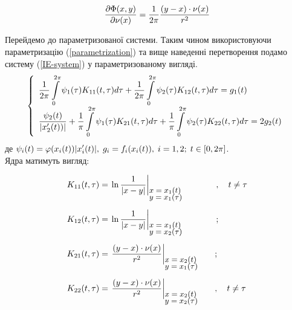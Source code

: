 \documentclass[14pt,a4paper]{extarticle}
\newcounter{e}
\numberwithin{equation}{section}
\newcommand{\intl}{\int\limits}
\newcommand{\inttwopi}{\intl_{0}^{2\pi}}
\begin{document}
\begin{equation}
	\pdv{\Phi(x, y)}{\nu(x)} = \frac{1}{2\pi} \frac{(y - x) \cdot \nu(x)}{r^2} 
\end{equation}


Перейдемо до параметризованої системи. Таким чином використовуючи параметризацію (\ref{parametrization}) та вище наведенні перетворення подамо систему (\ref{IE-system}) у параметризованому вигляді.
\begin{equation}
\label{IE-parametrized-with-specia}
	\left\{
	\begin{array}{l}
		\displaystyle
		\frac{1}{2\pi} \inttwopi \psi_1(\tau) K_{11}(t, \tau) d \tau
		+ \frac{1}{2\pi} \inttwopi  \psi_2(\tau) K_{12}(t, \tau) d \tau
		= g_{1}(t)
		\\ [0.3cm]
		\displaystyle
		\frac{\psi_2(t)}{\abs{x'_{2}(t)) }}
		+ \frac{1}{\pi} \inttwopi \psi_1(\tau) K_{21}(t, \tau) d \tau
		+ \frac{1}{\pi} \inttwopi  \psi_2(\tau) K_{22}(t, \tau) d \tau
		= 2g_{2}(t)
	\end{array}\right.
\end{equation}
де $\displaystyle \psi_{i}(t) = \varphi(x_{i}(t)) \abs{x'_{i}(t)}, \; g_{i} = f_{i}(x_{i}(t)), \;  i  = 1, 2; \; t \in [0, 2\pi]$. \\[0.3cm]
Ядра матимуть вигляд:

$$
	\begin{array}{l}
		\displaystyle
		K_{11}(t, \tau) = \left.
			 \ln{\frac{1}{\abs{x - y}}}
		\right|_{
			{\small \parbox{20mm}{$ x = x_1(t)$ \\[-3pt] $y = x_1 ({\tau})$}}
		} \quad \quad, \quad t \neq \tau
		\\ [0.8cm]
		
		\displaystyle
		K_{12}(t, \tau) = \left.
			\ln{\frac{1}{\abs{x - y}}}
		\right|_{
			{\small \parbox{20mm}{$ x = x_1(t)$ \\[-3pt] $y = x_2 ({\tau})$}}
		} \quad \quad;
		\\ [0.8cm]
		
		\displaystyle
		K_{21}(t, \tau) = \left.
			\frac{(y - x) \cdot \nu(x)}{r^2}
		\right|_{
			{\small \parbox{20mm}{$ x = x_2(t)$ \\[-3pt] $y = x_1 ({\tau})$}}
		};
		\\ [0.8cm]
		
		\displaystyle
		K_{22}(t, \tau) = \left.
			\frac{(y - x) \cdot \nu(x)}{r^2}
		\right|_{
			{\small \parbox{20mm}{$ x = x_2(t)$ \\[-3pt] $y = x_2 ({\tau})$}}
		} 
		, \quad t \neq \tau
	\end{array}
$$
\end{document}
